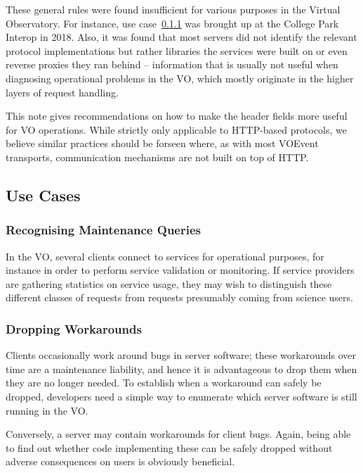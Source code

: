 \documentclass[11pt,a4paper]{ivoa}
\begin{document}
These general rules were found insufficient for various purposes in the
Virtual Observatory.  For instance, use case~\ref{uc:stats} was brought
up at the College Park Interop in 2018.  Also, it was found that most
servers did not identify the relevant protocol implementations but
rather libraries the services were built on or even reverse proxies they
ran behind -- information that is usually not useful when diagnosing
operational problems in the VO, which mostly originate in the higher
layers of request handling.

This note gives recommendations on how to make the header fields more
useful for VO operations.  While strictly only applicable to HTTP-based
protocols, we believe similar practices should be forseen where, as
with most VOEvent transports, communication mechanisms are not built on
top of HTTP.


\subsection{Use Cases}

\subsubsection{Recognising Maintenance Queries}
\label{uc:stats}

In the VO, several clients connect to services for operational purposes,
for instance in order to perform service validation or monitoring. If
service providers are gathering statistics on service usage, they may
wish to distinguish these different classes of requests from requests
presumably coming from science users.

\subsubsection{Dropping Workarounds}
\label{uc:global}

Clients occasionally work around bugs in server software; these
workarounds over time are a maintenance liability, and hence it is
advantageous to drop them when they are no longer needed.  To establish
when a workaround can safely be dropped, developers need a simple way to
enumerate which server software is still running in the VO.

Conversely, a server may contain workarounds for client bugs.  Again,
being able to find out whether code implementing these can be safely
dropped without adverse consequences on users is obviously beneficial.
\end{document}
